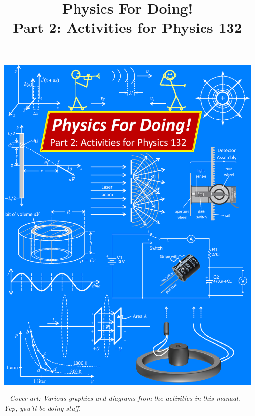 \thispagestyle{empty}

\begin{center}
\includegraphics[width=7.3in,trim={0 0 .1cm 0},clip]{132_front_pages/132_front_cover.eps}
\end{center}
\newpage

\restoregeometry
\restorepagecolor
\thispagestyle{empty}

\
\vfill
\textit{Cover art: Various graphics and diagrams from the activities in this manual.  Yep, you'll be doing stuff.}
\pagebreak


\title{Physics For Doing!\\
Part 2: Activities for Physics 132}

